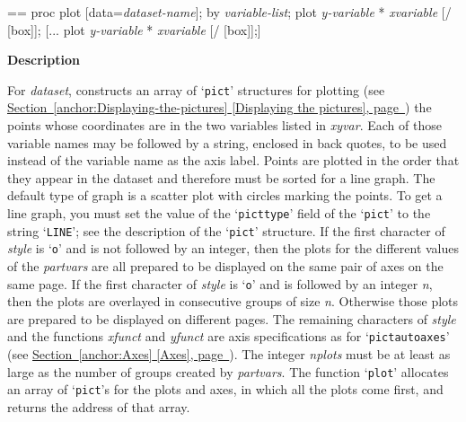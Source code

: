 \documentclass{book}
\makeatletter
\newcommand\Texinfocommandstyletextvar[1]{{\normalfont{}\textsl{#1}}}%
\newenvironment{Texinfopreformatted}{%
  \par\GNUTobeylines\obeyspaces\frenchspacing\parskip=\z@\parindent=\z@}{}
{\catcode`\^^M=13 \gdef\GNUTobeylines{\catcode`\^^M=13 \def^^M{\null\par}}}
\newenvironment{Texinfoindented}{\begin{list}{}{}\item\relax}{\end{list}}
\renewcommand{\_}{\Texinfounderscore\discretionary{}{}{}}
\makeatother
\begin{document}
\begin{Texinfoindented}
\begin{Texinfopreformatted}%
proc plot [data=\Texinfocommandstyletextvar{dataset-name}];
by \Texinfocommandstyletextvar{variable-list};
plot \Texinfocommandstyletextvar{y-variable} * \Texinfocommandstyletextvar{xvariable} [/ [box]];
[...
plot \Texinfocommandstyletextvar{y-variable} * \Texinfocommandstyletextvar{xvariable} [/ [box]];]
\end{Texinfopreformatted}
\end{Texinfoindented}

%
%
%
%
%

\noindent{}\textbf{Description}

For \Texinfocommandstyletextvar{dataset},
constructs an array of `\texttt{pict}' structures for
plotting (see \hyperref[anchor:Displaying-the-pictures]{Section~\ref*{anchor:Displaying-the-pictures} [Displaying the pictures], page~\pageref*{anchor:Displaying-the-pictures}})
the points whose coordinates are in the two variables listed in \Texinfocommandstyletextvar{xyvar}.
Each of those variable names may be followed by a string, enclosed in back quotes,
to be used instead of the variable name as the axis label.
Points are plotted in the order that they appear in the dataset and therefore must be sorted
for a line graph.
The default type of graph is a scatter plot with circles marking the points.
To get a line graph, you must set the value of the `\texttt{pict\_type}'
field of the `\texttt{pict}' to the string `\texttt{LINE}';
see the description of the `\texttt{pict}' structure.
If the first character of \Texinfocommandstyletextvar{style} is `\texttt{o}'
and is not followed by an integer,
then the plots for the different values of the \Texinfocommandstyletextvar{partvars}
are all prepared to be displayed on the same pair of axes on the same page.
If the first character of \Texinfocommandstyletextvar{style} is `\texttt{o}'
and is followed by an integer \Texinfocommandstyletextvar{n},
then the plots are overlayed in consecutive groups of size \Texinfocommandstyletextvar{n}.
Otherwise those plots are prepared to be displayed on different pages.
The remaining characters of \Texinfocommandstyletextvar{style}
and the functions \Texinfocommandstyletextvar{xfunct} and \Texinfocommandstyletextvar{yfunct}
are axis specifications as for `\texttt{pict\_autoaxes}' (see \hyperref[anchor:Axes]{Section~\ref*{anchor:Axes} [Axes], page~\pageref*{anchor:Axes}}).
The integer \Texinfocommandstyletextvar{nplots}
must be at least as large as the number of groups created by
\Texinfocommandstyletextvar{partvars}.
The function
`\texttt{plot}' allocates an array of `\texttt{pict}'s for the plots and axes, in which all
the plots come first, and returns the address of that array.
\end{document}
